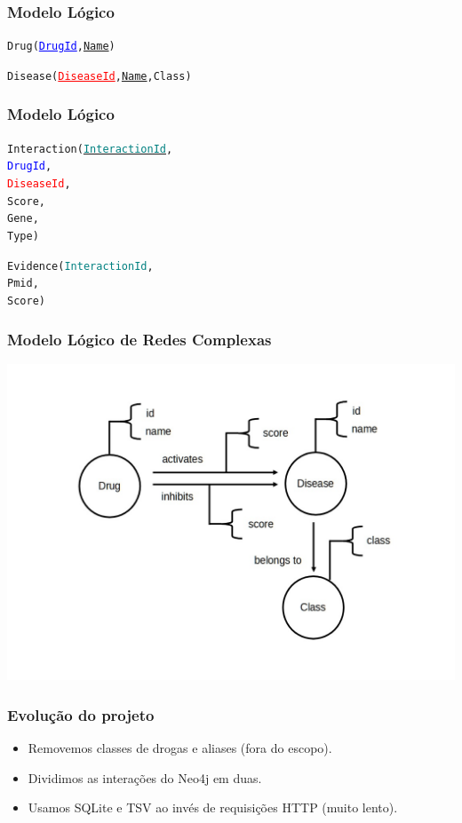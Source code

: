 \documentclass[12pt]{beamer}
\begin{document}
\begin{frame}
  \frametitle{Modelo Lógico}

  \begin{alltt}
    Drug(\textcolor{blue}{\underline{DrugId}}, \underline{Name})
    
    Disease(\textcolor{red}{\underline{DiseaseId}}, \underline{Name}, Class)
    
  \end{alltt}
\end{frame}

\begin{frame}
  \frametitle{Modelo Lógico}

  \begin{alltt}
    Interaction(\underline{\textcolor{teal}{InteractionId}},
                \textcolor{blue}{DrugId},
                \textcolor{red}{DiseaseId},
                Score,
                Gene,
                Type)
               
    Evidence(\textcolor{teal}{InteractionId},
                Pmid,
                Score)
                  
  \end{alltt}
\end{frame}

\begin{frame}
  \frametitle{Modelo Lógico de Redes Complexas}
  \centering
  \includegraphics[scale=0.275]{grafo.png}
\end{frame}

\begin{frame}
  \frametitle{Evolução do projeto}
  
  \begin{itemize}
    \item Removemos classes de drogas e aliases (fora do escopo).
    \item Dividimos as interações do Neo4j em duas.
    \item Usamos SQLite e TSV ao invés de requisições HTTP (muito lento).
  \end{itemize}
\end{frame}
\end{document}

